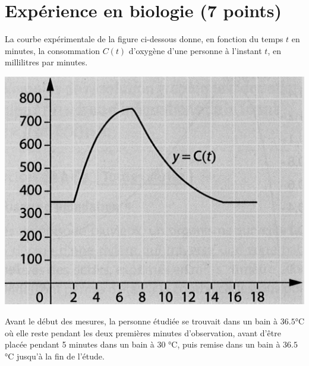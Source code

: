 \section{Expérience en biologie (7 points)}

La courbe expérimentale de la figure ci-dessous donne, en fonction du temps $t$ en minutes, la consommation $C(t)$ d'oxygène d'une personne à l'instant $t$, en millilitres par minutes.

\begin{center}
	\includegraphics[scale=0.4]{img/bio}	
\end{center}

Avant le début des mesures, la personne étudiée se trouvait dans un bain à $\num{36.5} $°C où elle reste pendant les deux premières minutes d'observation, avant d'être placée pendant 5 minutes dans un bain à 30 °C, puis remise dans un bain à $\num{36.5} $ °C jusqu'à la fin de l'étude.

